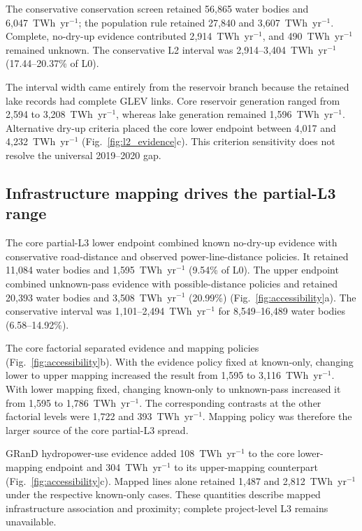 The conservative conservation screen retained 56{,}865 water bodies and 6{,}047~TWh~yr$^{-1}$; the population rule retained 27{,}840 and 3{,}607~TWh~yr$^{-1}$. Complete, no-dry-up evidence contributed 2{,}914~TWh~yr$^{-1}$, and 490~TWh~yr$^{-1}$ remained unknown. The conservative L2 interval was 2{,}914--3{,}404~TWh~yr$^{-1}$ (17.44--20.37\% of L0).

The interval width came entirely from the reservoir branch because the retained lake records had complete GLEV links. Core reservoir generation ranged from 2{,}594 to 3{,}208~TWh~yr$^{-1}$, whereas lake generation remained 1{,}596~TWh~yr$^{-1}$. Alternative dry-up criteria placed the core lower endpoint between 4{,}017 and 4{,}232~TWh~yr$^{-1}$ (Fig.~\ref{fig:l2_evidence}c). This criterion sensitivity does not resolve the universal 2019--2020 gap.

\subsection{Infrastructure mapping drives the partial-L3 range}

The core partial-L3 lower endpoint combined known no-dry-up evidence with conservative road-distance and observed power-line-distance policies. It retained 11{,}084 water bodies and 1{,}595~TWh~yr$^{-1}$ (9.54\% of L0). The upper endpoint combined unknown-pass evidence with possible-distance policies and retained 20{,}393 water bodies and 3{,}508~TWh~yr$^{-1}$ (20.99\%) (Fig.~\ref{fig:accessibility}a). The conservative interval was 1{,}101--2{,}494~TWh~yr$^{-1}$ for 8{,}549--16{,}489 water bodies (6.58--14.92\%).

The core factorial separated evidence and mapping policies (Fig.~\ref{fig:accessibility}b). With the evidence policy fixed at known-only, changing lower to upper mapping increased the result from 1{,}595 to 3{,}116~TWh~yr$^{-1}$. With lower mapping fixed, changing known-only to unknown-pass increased it from 1{,}595 to 1{,}786~TWh~yr$^{-1}$. The corresponding contrasts at the other factorial levels were 1{,}722 and 393~TWh~yr$^{-1}$. Mapping policy was therefore the larger source of the core partial-L3 spread.

GRanD hydropower-use evidence added 108~TWh~yr$^{-1}$ to the core lower-mapping endpoint and 304~TWh~yr$^{-1}$ to its upper-mapping counterpart (Fig.~\ref{fig:accessibility}c). Mapped lines alone retained 1{,}487 and 2{,}812~TWh~yr$^{-1}$ under the respective known-only cases. These quantities describe mapped infrastructure association and proximity; complete project-level L3 remains unavailable.

